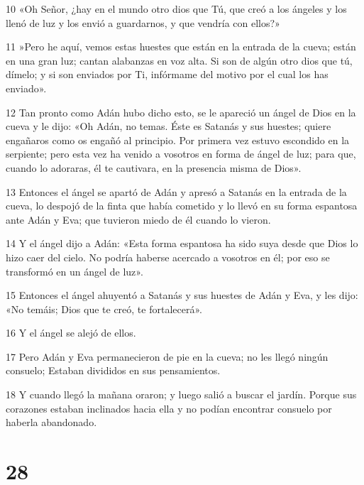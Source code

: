 \par 10 «Oh Señor, ¿hay en el mundo otro dios que Tú, que creó a los ángeles y los llenó de luz y los envió a guardarnos, y que vendría con ellos?»

\par 11 »Pero he aquí, vemos estas huestes que están en la entrada de la cueva; están en una gran luz; cantan alabanzas en voz alta. Si son de algún otro dios que tú, dímelo; y si son enviados por Ti, infórmame del motivo por el cual los has enviado».

\par 12 Tan pronto como Adán hubo dicho esto, se le apareció un ángel de Dios en la cueva y le dijo: «Oh Adán, no temas. Éste es Satanás y sus huestes; quiere engañaros como os engañó al principio. Por primera vez estuvo escondido en la serpiente; pero esta vez ha venido a vosotros en forma de ángel de luz; para que, cuando lo adoraras, él te cautivara, en la presencia misma de Dios».

\par 13 Entonces el ángel se apartó de Adán y apresó a Satanás en la entrada de la cueva, lo despojó de la finta que había cometido y lo llevó en su forma espantosa ante Adán y Eva; que tuvieron miedo de él cuando lo vieron.

\par 14 Y el ángel dijo a Adán: «Esta forma espantosa ha sido suya desde que Dios lo hizo caer del cielo. No podría haberse acercado a vosotros en él; por eso se transformó en un ángel de luz».

\par 15 Entonces el ángel ahuyentó a Satanás y sus huestes de Adán y Eva, y les dijo: «No temáis; Dios que te creó, te fortalecerá».

\par 16 Y el ángel se alejó de ellos.

\par 17 Pero Adán y Eva permanecieron de pie en la cueva; no les llegó ningún consuelo; Estaban divididos en sus pensamientos.

\par 18 Y cuando llegó la mañana oraron; y luego salió a buscar el jardín. Porque sus corazones estaban inclinados hacia ella y no podían encontrar consuelo por haberla abandonado.

\chapter{28}

